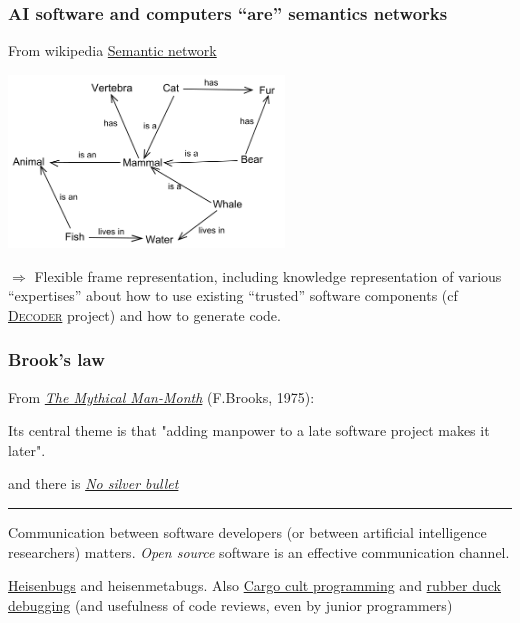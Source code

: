 \documentclass[xcolor=svgnames,final,smaller,a4]{beamer}
\begin{document}
 \begin{frame}
   \frametitle{AI software and computers ``are'' semantics networks}
 

 From wikipedia
 \href{https://en.wikipedia.org/wiki/Semantic_network}{Semantic
   network} {}

 \bigskip

 \begin{center}
 \includegraphics[width=0.55\textwidth]{Semantic-Net}
 \end{center}
 
 \bigskip
 
 $\Rightarrow$ Flexible frame representation, including knowledge
 representation of various ``expertises'' about how to use existing
 ``trusted'' software components (cf
 \href{https://www.decoder-project.eu/}{\textsc{Decoder}} project) and
 how to generate code.
 \end{frame}

 \begin{frame}
   \frametitle{Brook's law}

   From \href{https://en.wikipedia.org/wiki/The_Mythical_Man-Month}{\textit{The Mythical Man-Month}} (F.Brooks, 1975):

   Its central theme is that "adding manpower to a late software project makes it later".

   \medskip

   and there is \href{https://en.wikipedia.org/wiki/No_Silver_Bullet}{\textit{No silver bullet}}

   \smallskip
   
   \hrule

   \medskip
   
   Communication between software developers (or between artificial intelligence researchers) matters.
   \emph{Open source} software is an effective communication channel.

   \medskip

   \href{https://en.wikipedia.org/wiki/Heisenbug}{Heisenbugs} and
   heisenmetabugs.  Also
   \href{https://en.wikipedia.org/wiki/Cargo_cult_programming}{Cargo
     cult programming} and
   \href{https://en.wikipedia.org/wiki/Rubber_duck_debugging}{rubber
     duck debugging} (and usefulness of code reviews, even by junior programmers)
   
 \end{frame}
\end{document}
